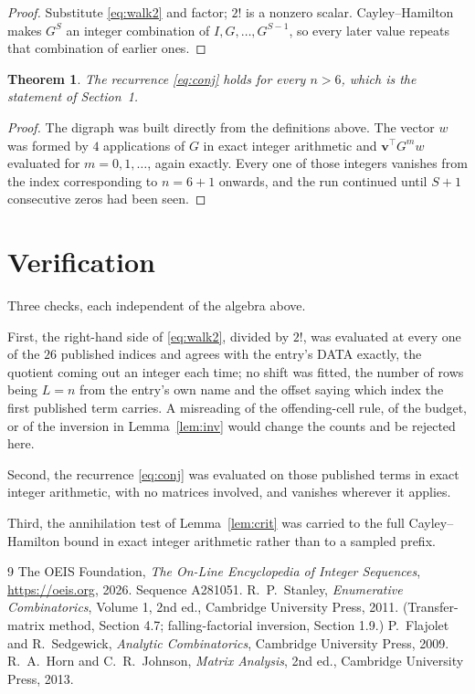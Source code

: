 \documentclass[11pt,a4paper]{article}
\theoremstyle{plain}
\newtheorem{theorem}{Theorem}
\theoremstyle{definition}
\begin{document}
\begin{proof}
Substitute \eqref{eq:walk2} and factor; $2!$ is a nonzero scalar. Cayley--Hamilton
makes $G^{S}$ an integer combination of $I,G,\dots,G^{S-1}$, so every later value repeats
that combination of earlier ones.
\end{proof}

\begin{theorem}
The recurrence \eqref{eq:conj} holds for every $n>6$, which is the statement of
Section~1.
\end{theorem}

\begin{proof}
The digraph was built directly from the definitions above. The vector $w$ was formed by
$4$ applications of $G$ in exact integer arithmetic and $\mathbf{v}^{\!\top}G^{m}w$
evaluated for $m=0,1,\dots$, again exactly. Every one of those integers vanishes from the
index corresponding to $n=6+1$ onwards, and the run continued until $S+1$ consecutive
zeros had been seen.
\end{proof}

\section{Verification}

Three checks, each independent of the algebra above.

First, the right-hand side of \eqref{eq:walk2}, divided by $2!$, was evaluated at every
one of the $26$ published indices and agrees with the entry's DATA exactly, the quotient
coming out an integer each time; no shift was fitted, the number of rows being
$L=n$ from the entry's own name and the offset saying which index the first published
term carries. A misreading of the offending-cell rule, of the budget, or of the inversion in
Lemma~\ref{lem:inv} would change the counts and be rejected here.

Second, the recurrence \eqref{eq:conj} was evaluated on those published terms in exact
integer arithmetic, with no matrices involved, and vanishes wherever it applies.

Third, the annihilation test of Lemma~\ref{lem:crit} was carried to the full
Cayley--Hamilton bound in exact integer arithmetic rather than to a sampled prefix.

\begin{thebibliography}{9}
 The OEIS Foundation, \emph{The On-Line Encyclopedia of Integer
Sequences}, \url{https://oeis.org}, 2026. Sequence A281051.
 R.~P.~Stanley, \emph{Enumerative Combinatorics}, Volume 1, 2nd ed.,
Cambridge University Press, 2011. (Transfer-matrix method, Section 4.7; falling-factorial
inversion, Section 1.9.)
 P.~Flajolet and R.~Sedgewick, \emph{Analytic Combinatorics}, Cambridge
University Press, 2009.
 R.~A.~Horn and C.~R.~Johnson, \emph{Matrix Analysis}, 2nd ed., Cambridge
University Press, 2013.
\end{thebibliography}
\end{document}
